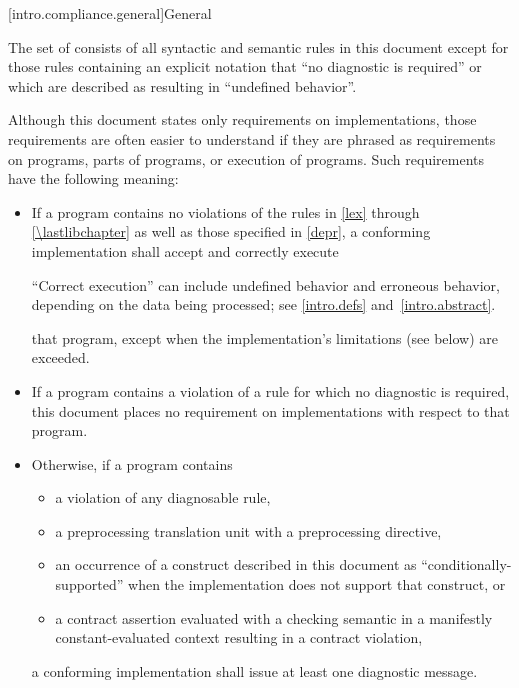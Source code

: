 [intro.compliance.general]{General}

\pnum
{}%
%
The set of
consists of all syntactic and semantic rules in this document
except for those rules containing an explicit notation that
``no diagnostic is required'' or which are described as resulting in
``undefined behavior''.

\pnum
{}%
Although this document states only requirements on \Cpp{}
implementations, those requirements are often easier to understand if
they are phrased as requirements on programs, parts of programs, or
execution of programs. Such requirements have the following meaning:
\begin{itemize}
\item
If a program contains no violations of the rules in
\ref{lex} through \ref{\lastlibchapter} as well as those specified in \ref{depr},
a conforming implementation shall accept and correctly execute
\begin{footnote}
``Correct execution'' can include undefined behavior
and erroneous behavior, depending on
the data being processed; see \ref{intro.defs} and~\ref{intro.abstract}.
\end{footnote}
that program,
except when the implementation's limitations (see below) are exceeded.
\item
{}%
If a program contains a violation of a rule for which no diagnostic is required,
this document places no requirement on implementations
with respect to that program.

\item
{}%
%
%
Otherwise, if a program contains
\begin{itemize}
\item
a violation of any diagnosable rule,
\item
a preprocessing translation unit with
a  preprocessing directive,
\item
an occurrence
of a construct described in this document as ``conditionally-supported'' when
the implementation does not support that construct, or
\item
a contract assertion
evaluated with a checking semantic
in a manifestly constant-evaluated context
resulting in a contract violation,
\end{itemize}
a conforming implementation
shall issue at least one diagnostic message.
\end{itemize}
